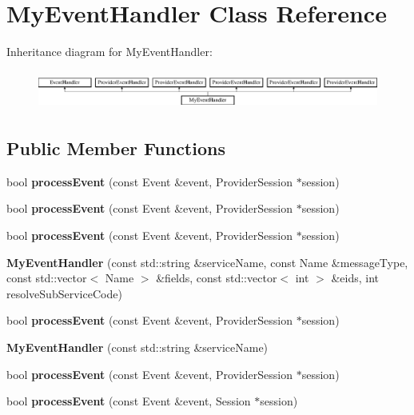 \section{My\+Event\+Handler Class Reference}
\label{class_my_event_handler}
Inheritance diagram for My\+Event\+Handler\+:\begin{figure}[H]
\begin{center}
\leavevmode
\includegraphics[height=1.278539cm]{de/d85/class_my_event_handler}
\end{center}
\end{figure}
\subsection*{Public Member Functions}
\begin{DoxyCompactItemize}
\item 
bool {\bfseries process\+Event} (const Event \&event, Provider\+Session $\ast$session)\label{class_my_event_handler_a723ee0f5f887ae0bb61356d4b39a7a96}

\item 
bool {\bfseries process\+Event} (const Event \&event, Provider\+Session $\ast$session)\label{class_my_event_handler_a723ee0f5f887ae0bb61356d4b39a7a96}

\item 
bool {\bfseries process\+Event} (const Event \&event, Provider\+Session $\ast$session)\label{class_my_event_handler_a723ee0f5f887ae0bb61356d4b39a7a96}

\item 
{\bfseries My\+Event\+Handler} (const std\+::string \&service\+Name, const Name \&message\+Type, const std\+::vector$<$ Name $>$ \&fields, const std\+::vector$<$ int $>$ \&eids, int resolve\+Sub\+Service\+Code)\label{class_my_event_handler_aee336603e96d800244bedf1522b4c453}

\item 
bool {\bfseries process\+Event} (const Event \&event, Provider\+Session $\ast$session)\label{class_my_event_handler_a723ee0f5f887ae0bb61356d4b39a7a96}

\item 
{\bfseries My\+Event\+Handler} (const std\+::string \&service\+Name)\label{class_my_event_handler_a96e1d640a9e70e1f52aa06762dbf136a}

\item 
bool {\bfseries process\+Event} (const Event \&event, Provider\+Session $\ast$session)\label{class_my_event_handler_a723ee0f5f887ae0bb61356d4b39a7a96}

\item 
bool {\bfseries process\+Event} (const Event \&event, Session $\ast$session)\label{class_my_event_handler_afff2c0ef504e5c73cd98215024ce51c7}

\end{DoxyCompactItemize}


